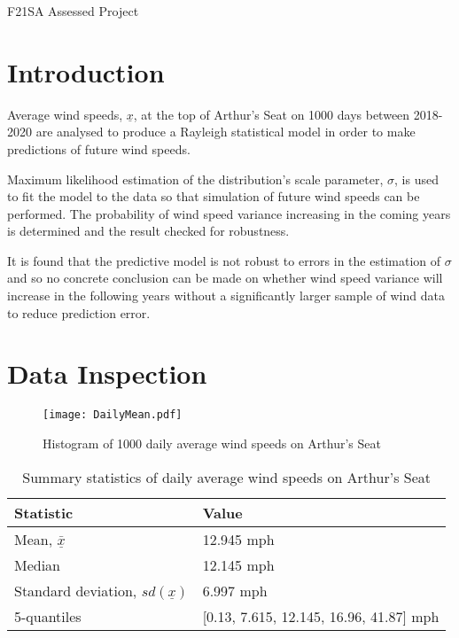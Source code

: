 \documentclass[11pt]{article}
\begin{document}
\begin{center}
    \Large{F21SA Assessed Project}
\end{center}

\section{Introduction}

Average wind speeds, $\underline{x}$, at the top of Arthur's Seat on 1000
days between 2018-2020 are analysed to produce a Rayleigh statistical
model in order to make predictions of future wind speeds.

Maximum likelihood estimation of the distribution's scale parameter,
$\sigma$, is used to fit the model to the data so that simulation of
future wind speeds can be performed. The probability of wind speed variance
increasing in the coming years is determined and the result checked for
robustness.

It is found that the predictive model is not robust to errors in the
estimation of $\sigma$ and so no concrete conclusion can be made on
whether wind speed variance will increase in the following years without
a significantly larger sample of wind data to reduce prediction error.

\section{Data Inspection}

\begin{figure}[ht]
    \centering
	\texttt{[image: DailyMean.pdf]}
    \caption{Histogram of 1000 daily average wind speeds on Arthur's Seat}
    \label{fig:histogram}
\end{figure}


\begin{table}[ht]
    \centering
    \begin{tabular}{ll}
    Statistic & Value \\ \hline
    Mean, $\underline{\bar x}$ & 12.945 mph \\
    Median & 12.145 mph \\
    Standard deviation, $sd(\underline{x})$ & 6.997 mph \\
    5-quantiles & [0.13, 7.615, 12.145, 16.96, 41.87] mph
    \end{tabular}
    \caption{Summary statistics of daily average wind speeds on Arthur's Seat}
    \label{t:data}
\end{table}
\end{document}
